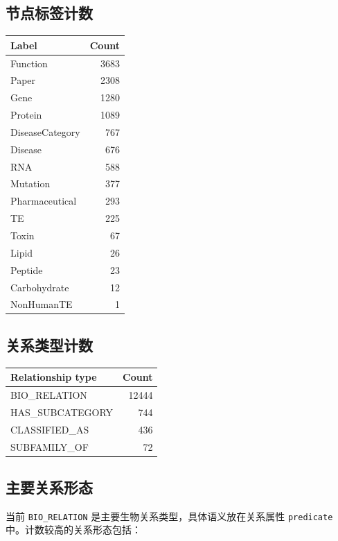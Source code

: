 \documentclass[UTF8]{ctexart}
\begin{document}
\subsection{节点标签计数}

\begin{longtable}{lr}
\toprule
Label & Count \\
\midrule
\endhead
Function & 3683 \\
Paper & 2308 \\
Gene & 1280 \\
Protein & 1089 \\
DiseaseCategory & 767 \\
Disease & 676 \\
RNA & 588 \\
Mutation & 377 \\
Pharmaceutical & 293 \\
TE & 225 \\
Toxin & 67 \\
Lipid & 26 \\
Peptide & 23 \\
Carbohydrate & 12 \\
NonHumanTE & 1 \\
\bottomrule
\end{longtable}

\subsection{关系类型计数}

\begin{longtable}{lr}
\toprule
Relationship type & Count \\
\midrule
\endhead
BIO\_RELATION & 12444 \\
HAS\_SUBCATEGORY & 744 \\
CLASSIFIED\_AS & 436 \\
SUBFAMILY\_OF & 72 \\
\bottomrule
\end{longtable}

\subsection{主要关系形态}

当前 \texttt{BIO\_RELATION} 是主要生物关系类型，具体语义放在关系属性 \texttt{predicate} 中。计数较高的关系形态包括：
\end{document}
